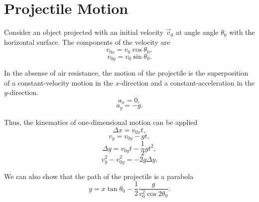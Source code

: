\documentclass[11pt,a4paper]{report}
\begin{document}
\section*{Projectile Motion}

Consider an object projected with an initial velocity $\vec{v}_0$ at angle angle $\theta_0$ with the horizontal surface. The components of the velocity are $$v_{0x} = v_0 \cos{\theta_0},$$ $$v_{0y} = v_0 \sin{\theta_0}.$$

\noindent
In the absense of air resistance, the motion of the projectile is the superposition of a constant-velocity motion in the $x$-direction and a constant-acceleration in the $y$-direction. $$a_x = 0,$$ $$a_y = -g.$$

\noindent
Thus, the kinematics of one-dimensional motion can be applied $$\Delta{x} = v_{0x} t,$$ $$v_y = v_{0y} - gt,$$ $$\Delta{y} = v_{0y} t - \frac{1}{2} gt^2,$$ $$v_y^2 - v_{0y}^2 = -2g \Delta{y}.$$

We can also show that the path of the projectile is a parabola $$y = x\tan{\theta_0} - \frac{1}{2} \frac{g}{v_0^2 \cos{2\theta_0}}.$$
\end{document}
